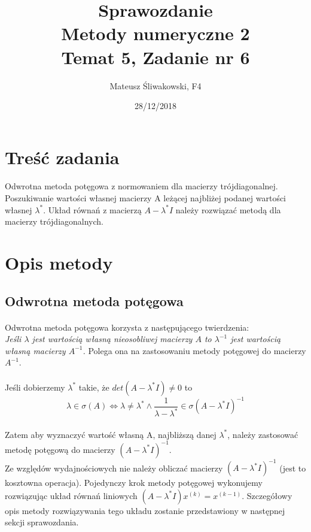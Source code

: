 \documentclass{article}
\title{Sprawozdanie \\Metody numeryczne 2 \\\textbf{Temat 5, Zadanie nr 6}}
\date{28/12/2018}
\author{Mateusz Śliwakowski, F4}
\begin{document}
  \maketitle
 	  \newpage

\section{Treść zadania}
\paragraph{}
Odwrotna metoda potęgowa z normowaniem dla macierzy trójdiagonalnej. Poszukiwanie wartości własnej macierzy A leżącej najbliżej podanej wartości własnej $\lambda^*$. Układ równań z macierzą $A - \lambda^*I$ należy rozwiązać metodą dla macierzy trójdiagonalnych.
\section{Opis metody}
\subsection{Odwrotna metoda potęgowa}
\paragraph{}
Odwrotna metoda potęgowa korzysta z następującego twierdzenia:\\
\textit{Jeśli $\lambda$ jest wartością własną nieosobliwej macierzy $A$ to $\lambda^{-1}$ jest wartością własną macierzy $A^{-1}$.}
Polega ona na zastosowaniu metody potęgowej do macierzy $A^{-1}$.
\paragraph{}
Jeśli dobierzemy $\lambda^*$ takie, że $det(A-\lambda^{*}I)\neq0$ to $$\lambda \in \sigma(A) \Leftrightarrow \lambda \neq \lambda^{*} \wedge \frac{1}{\lambda-\lambda^{*}} \in \sigma(A-\lambda^* I)^{-1}$$ 
\paragraph{}
Zatem aby wyznaczyć wartość własną A, najbliższą danej $\lambda^*$, należy zastosować metodę potęgową do macierzy $(A-\lambda^*I)^{-1}$.\\
Ze względów wydajnościowych nie należy obliczać macierzy $(A-\lambda^*I)^{-1}$ (jest to kosztowna operacja). Pojedynczy krok metody potęgowej wykonujemy rozwiązując układ równań liniowych $(A - \lambda^*I)x^{(k)} = x^{(k-1)}$. Szczegółowy opis metody rozwiązywania tego układu zostanie przedstawiony w następnej sekcji sprawozdania.
\end{document}
